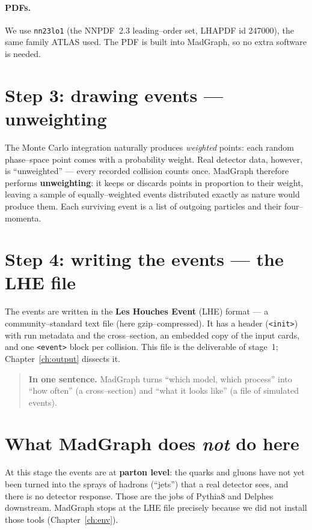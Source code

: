 \documentclass[11pt,oneside]{report}
\newcommand{\code}[1]{\texttt{#1}}
\begin{document}
\paragraph{PDFs.} We use \code{nn23lo1} (the NNPDF~2.3 leading--order set, LHAPDF id 247000), the
same family ATLAS used. The PDF is built into MadGraph, so no extra software is needed.

\section{Step 3: drawing events --- unweighting}
The Monte Carlo integration naturally produces \emph{weighted} points: each random phase--space
point comes with a probability weight. Real detector data, however, is ``unweighted'' --- every
recorded collision counts once. MadGraph therefore performs \textbf{unweighting}: it keeps or
discards points in proportion to their weight, leaving a sample of equally--weighted events
distributed exactly as nature would produce them. Each surviving event is a list of outgoing
particles and their four--momenta.

\section{Step 4: writing the events --- the LHE file}
The events are written in the \textbf{Les Houches Event} (LHE) format --- a community--standard
text file (here gzip--compressed). It has a header (\code{<init>}) with run metadata and the
cross--section, an embedded copy of the input cards, and one \code{<event>} block per collision.
This file is the deliverable of stage~1; Chapter~\ref{ch:output} dissects it.

\begin{quote}\textbf{In one sentence.} MadGraph turns ``which model, which process'' into ``how
often'' (a cross--section) and ``what it looks like'' (a file of simulated events).\end{quote}

\section{What MadGraph does \emph{not} do here}
At this stage the events are at \textbf{parton level}: the quarks and gluons have not yet been
turned into the sprays of hadrons (``jets'') that a real detector sees, and there is no detector
response. Those are the jobs of Pythia8 and Delphes downstream. MadGraph stops at the LHE file
precisely because we did not install those tools (Chapter~\ref{ch:env}).
\end{document}
